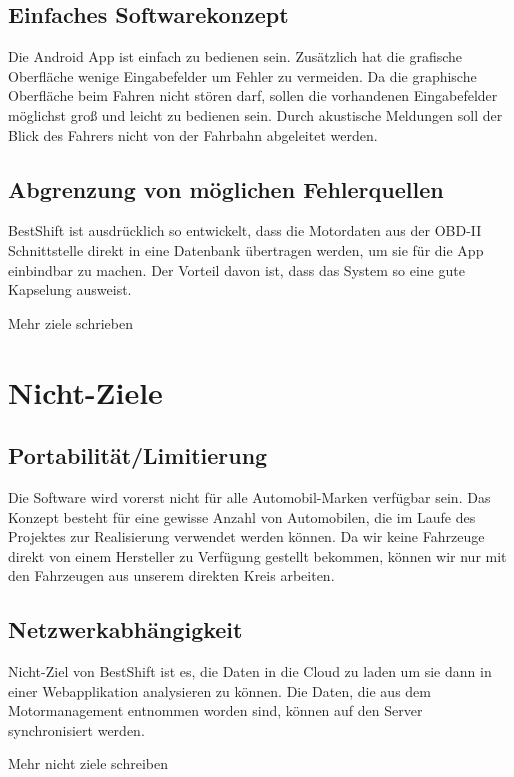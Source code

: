 \subsection{Einfaches Softwarekonzept}
Die Android App ist einfach zu bedienen sein. Zusätzlich hat die grafische Oberfläche wenige Eingabefelder um Fehler zu vermeiden.
Da die graphische Oberfläche beim Fahren nicht stören darf, sollen die vorhandenen Eingabefelder möglichst groß und leicht zu bedienen sein. Durch akustische Meldungen soll der Blick des Fahrers nicht von der Fahrbahn abgeleitet werden.

\subsection{Abgrenzung von möglichen Fehlerquellen}
BestShift ist ausdrücklich so entwickelt, dass die Motordaten aus der OBD-II Schnittstelle direkt in eine Datenbank übertragen werden, um sie für die App einbindbar zu machen. Der Vorteil davon ist, dass das System so eine gute Kapselung ausweist.

\todo Mehr ziele schrieben

\section{Nicht-Ziele}

\subsection{Portabilität/Limitierung}
Die Software wird vorerst nicht für alle Automobil-Marken verfügbar sein. Das Konzept besteht für eine gewisse Anzahl von Automobilen, die im Laufe des Projektes zur Realisierung verwendet werden können. Da wir keine Fahrzeuge direkt von einem Hersteller zu Verfügung gestellt bekommen, können wir nur mit den Fahrzeugen aus unserem direkten Kreis arbeiten. 

\subsection{Netzwerkabhängigkeit}
Nicht-Ziel von BestShift ist es, die Daten in die Cloud zu laden um sie dann in einer Webapplikation analysieren zu können. Die Daten, die aus dem Motormanagement entnommen worden sind, können auf den Server synchronisiert  werden. 

\todo Mehr nicht ziele schreiben